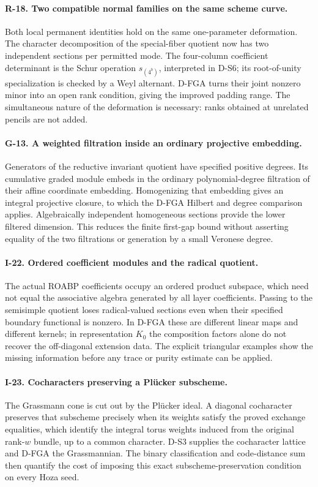 \paragraph{R-18. Two compatible normal families on the same scheme curve.}
Both local permanent identities hold on the same one-parameter deformation. The character decomposition of the special-fiber quotient now has two independent sections per permitted mode. The four-column coefficient determinant is the Schur operation $s_{(4^b)}$, interpreted in D-S6; its root-of-unity specialization is checked by a Weyl alternant. D-FGA turns their joint nonzero minor into an open rank condition, giving the improved padding range. The simultaneous nature of the deformation is necessary: ranks obtained at unrelated pencils are not added.

\paragraph{G-13. A weighted filtration inside an ordinary projective embedding.}
Generators of the reductive invariant quotient have specified positive degrees. Its cumulative graded module embeds in the ordinary polynomial-degree filtration of their affine coordinate embedding. Homogenizing that embedding gives an integral projective closure, to which the D-FGA Hilbert and degree comparison applies. Algebraically independent homogeneous sections provide the lower filtered dimension. This reduces the finite first-gap bound without asserting equality of the two filtrations or generation by a small Veronese degree.

\paragraph{I-22. Ordered coefficient modules and the radical quotient.}
The actual ROABP coefficients occupy an ordered product subspace, which need not equal the associative algebra generated by all layer coefficients. Passing to the semisimple quotient loses radical-valued sections even when their specified boundary functional is nonzero. In D-FGA these are different linear maps and different kernels; in representation $K_0$ the composition factors alone do not recover the off-diagonal extension data. The explicit triangular examples show the missing information before any trace or purity estimate can be applied.

\paragraph{I-23. Cocharacters preserving a Pl\"ucker subscheme.}
The Grassmann cone is cut out by the Pl\"ucker ideal. A diagonal cocharacter preserves that subscheme precisely when its weights satisfy the proved exchange equalities, which identify the integral torus weights induced from the original rank-$w$ bundle, up to a common character. D-S3 supplies the cocharacter lattice and D-FGA the Grassmannian. The binary classification and code-distance sum then quantify the cost of imposing this exact subscheme-preservation condition on every Hoza seed.


